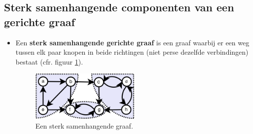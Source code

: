\subsection{Sterk samenhangende componenten van een gerichte graaf}
\begin{itemize}
	\item Een \textbf{sterk samenhangende gerichte graaf} is een graaf waarbij er een weg tussen elk paar knopen in beide richtingen (niet perse dezelfde verbindingen) bestaat (cfr. figuur \ref{fig:sterk_samenhangende_graaf}).
	\begin{figure}[ht]
		\centering
		\includegraphics[width=0.5\textwidth]{img/sterk_samenhangende_graaf}
		\caption{Een sterk samenhangende graaf.}
		\label{fig:sterk_samenhangende_graaf}
	\end{figure}
				

\end{itemize}
